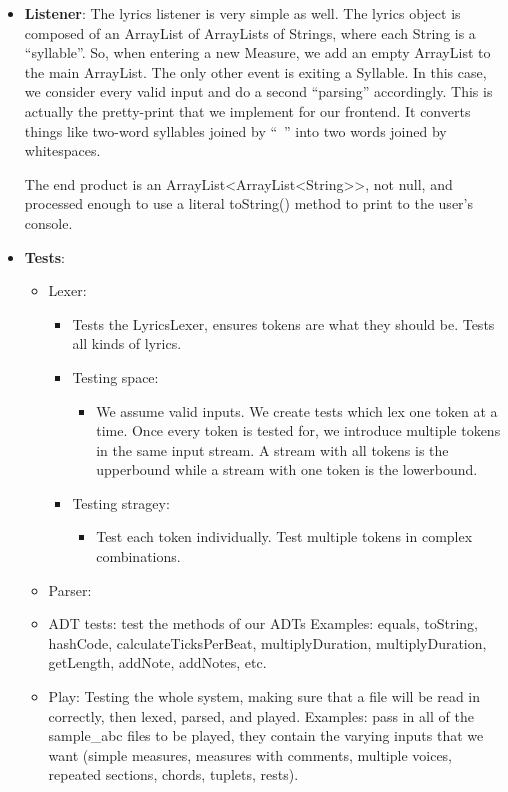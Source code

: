 \documentclass[12pt]{book}
\begin{document}
\begin{itemize}
\item {\bf Listener}: The lyrics listener is very simple as well. The lyrics object is composed of an ArrayList of ArrayLists of Strings, where each String is a ``syllable''. So, when entering a new Measure, we add an empty ArrayList to the main ArrayList. The only other event is exiting a Syllable. In this case, we consider every valid input and do a second ``parsing'' accordingly. This is actually the pretty-print that we implement for our frontend. It converts things like two-word syllables joined by ``~'' into two words joined by whitespaces.

The end product is an ArrayList<ArrayList<String>>, not null, and processed enough to use a literal toString() method to print to the user's console.

\item {\bf Tests}:
\begin{itemize}
\item Lexer:
\begin{itemize}
\item Tests the LyricsLexer, ensures tokens are what they should be. Tests all kinds of lyrics.

\item Testing space:

\begin{itemize} 
\item We assume valid inputs. We create tests which lex one token at a time. Once every token is tested for, we introduce multiple tokens in the same input stream. A stream with all tokens is the upperbound while a stream with one token is the lowerbound.
\end{itemize}

\item Testing stragey:

\begin{itemize}
\item Test each token individually. Test multiple tokens in complex combinations.
\end{itemize}
\end{itemize}

\item Parser: 


\item ADT tests: test the methods of our ADTs
Examples: equals, toString, hashCode, calculateTicksPerBeat, multiplyDuration, multiplyDuration, getLength, addNote, addNotes, etc.
\item Play: Testing the whole system, making sure that a file will be read in correctly, then lexed, parsed, and played.
Examples: pass in all of the sample\_abc files to be played, they contain the varying inputs that we want (simple measures, measures with comments, multiple voices, repeated sections, chords, tuplets, rests).
\end{itemize}

\end{itemize}
\end{document}
